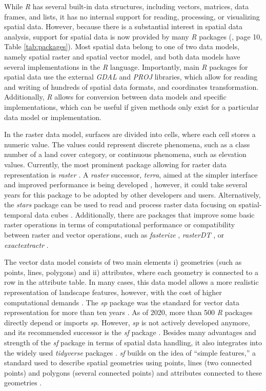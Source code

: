 \documentclass[smallextended]{svjour3}       %
\begin{document}
While \emph{R} has several built-in data structures, including vectors, matrices, data frames, and lists, it has no internal support for reading, processing, or visualizing spatial data.
However, because there is a substantial interest in spatial data analysis, support for spatial data is now provided by many \emph{R} packages (\cite{Lovelace2019}, page 10, Table \ref{tab:packages}).
Most spatial data belong to one of two data models, namely spatial raster and spatial vector model, and both data models have several implementations in the \emph{R} language.
Importantly, main \emph{R} packages for spatial data use the external \emph{GDAL} \cite{GDAL} and \emph{PROJ} \cite{PROJ} libraries, which allow for reading and writing of hundreds of spatial data formats, and coordinates transformation.
Additionally, \emph{R} allows for conversion between data models and specific implementations, which can be useful if given methods only exist for a particular data model or implementation.

In the raster data model, surfaces are divided into cells, where each cell stores a numeric value.
The values could represent discrete phenomena, such as a class number of a land cover category, or continuous phenomena, such as elevation values.
Currently, the most prominent package allowing for raster data representation is \emph{raster} \cite{Hijmans2019}.
A \emph{raster} successor, \emph{terra}, aimed at the simpler interface and improved performance is being developed \cite{R-terra}, however, it could take several years for this package to be adopted by other developers and users.
Alternatively, the \emph{stars} package can be used to read and process raster data focusing on spatial-temporal data cubes \cite{Pebesma2019}.
Additionally, there are packages that improve some basic raster operations in terms of computational performance or compatibility between raster and vector operations, such as \emph{fasterize} \cite{Ross2020}, \emph{rasterDT} \cite{OBrien2020}, or \emph{exactextractr} \cite{Baston2020}.

The vector data model consists of two main elements i) geometries (such as points, lines, polygons) and ii) attributes, where each geometry is connected to a row in the attribute table.
In many cases, this data model allows a more realistic representation of landscape features, however, with the cost of higher computational demands \cite{Lovelace2019}.
The \emph{sp} package was the standard for vector data representation for more than ten years \cite{Pebesma2005,Bivand2013}.
As of 2020, more than 500 \emph{R} packages directly depend or imports \emph{sp}.
However, \emph{sp} is not actively developed anymore, and its recommended successor is the \emph{sf} package \cite{Pebesma2018}.
Besides many advantages and strength of the \emph{sf} package in terms of spatial data handling, it also integrates into the widely used \emph{tidyverse} packages \cite{Wickham2019a}.
\emph{sf} builds on the idea of ``simple features,'' a standard used to describe spatial geometries using points, lines (two connected points) and polygons (several connected points) and attributes connected to these geometries \cite{Pebesma2019a}.
\end{document}

